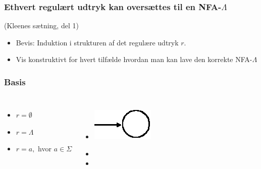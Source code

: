 \begin{frame}
\frametitle{Ethvert regulært udtryk kan oversættes til en NFA-$\Lambda$}
(Kleenes sætning, del 1)
\begin{itemize}
\item Bevis:
  Induktion i strukturen af det regulære udtryk $r$.
\item
Vis konstruktivt for hvert tilfælde hvordan man kan lave den korrekte NFA-$\Lambda$
\end{itemize}
\end{frame}
\begin{frame}
\frametitle{Basis}
\begin{columns}
\column{5cm}
\begin{itemize}
\item 
$r=\emptyset$
\item $r=\Lambda$
\item $r=a,$ hvor $a\in\Sigma$
\end{itemize}
\column{5cm}
\begin{itemize}
\item
\includegraphics[scale=0.4]{images/2_seminar_basis_emptyset}
\item
{}
\item
{}
\end{itemize}
\end{columns}
\end{frame}
